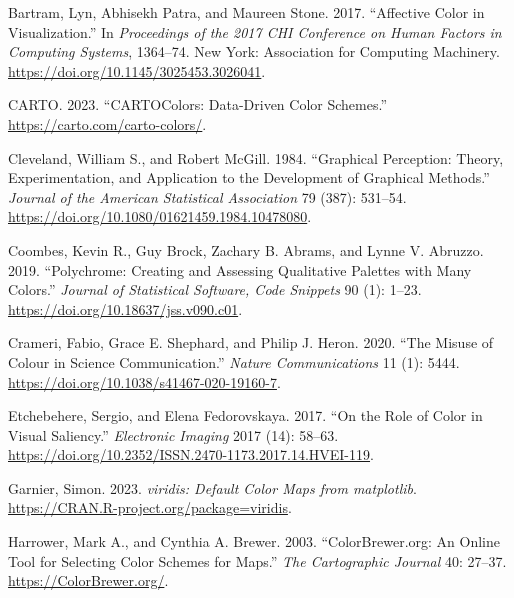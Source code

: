 \hypertarget{refs}{}
\begin{CSLReferences}{1}{0}
\leavevmode{}%
Bartram, Lyn, Abhisekh Patra, and Maureen Stone. 2017. {``Affective Color in Visualization.''} In \emph{Proceedings of the 2017 CHI Conference on Human Factors in Computing Systems}, 1364--74. New York: Association for Computing Machinery. \url{https://doi.org/10.1145/3025453.3026041}.

\leavevmode{}%
CARTO. 2023. {``CARTOColors: Data-Driven Color Schemes.''} \url{https://carto.com/carto-colors/}.

\leavevmode{}%
Cleveland, William S., and Robert McGill. 1984. {``Graphical Perception: Theory, Experimentation, and Application to the Development of Graphical Methods.''} \emph{Journal of the American Statistical Association} 79 (387): 531--54. \url{https://doi.org/10.1080/01621459.1984.10478080}.

\leavevmode{}%
Coombes, Kevin R., Guy Brock, Zachary B. Abrams, and Lynne V. Abruzzo. 2019. {``{Polychrome}: Creating and Assessing Qualitative Palettes with Many Colors.''} \emph{Journal of Statistical Software, Code Snippets} 90 (1): 1--23. \url{https://doi.org/10.18637/jss.v090.c01}.

\leavevmode{}%
Crameri, Fabio, Grace E. Shephard, and Philip J. Heron. 2020. {``The Misuse of Colour in Science Communication.''} \emph{Nature Communications} 11 (1): 5444. \url{https://doi.org/10.1038/s41467-020-19160-7}.

\leavevmode{}%
Etchebehere, Sergio, and Elena Fedorovskaya. 2017. {``On the Role of Color in Visual Saliency.''} \emph{Electronic Imaging} 2017 (14): 58--63. \url{https://doi.org/10.2352/ISSN.2470-1173.2017.14.HVEI-119}.

\leavevmode{}%
Garnier, Simon. 2023. \emph{{viridis}: Default Color Maps from {matplotlib}}. \url{https://CRAN.R-project.org/package=viridis}.

\leavevmode{}%
Harrower, Mark A., and Cynthia A. Brewer. 2003. {``{ColorBrewer.org}: An Online Tool for Selecting Color Schemes for Maps.''} \emph{The Cartographic Journal} 40: 27--37. \url{https://ColorBrewer.org/}.


\end{CSLReferences}
